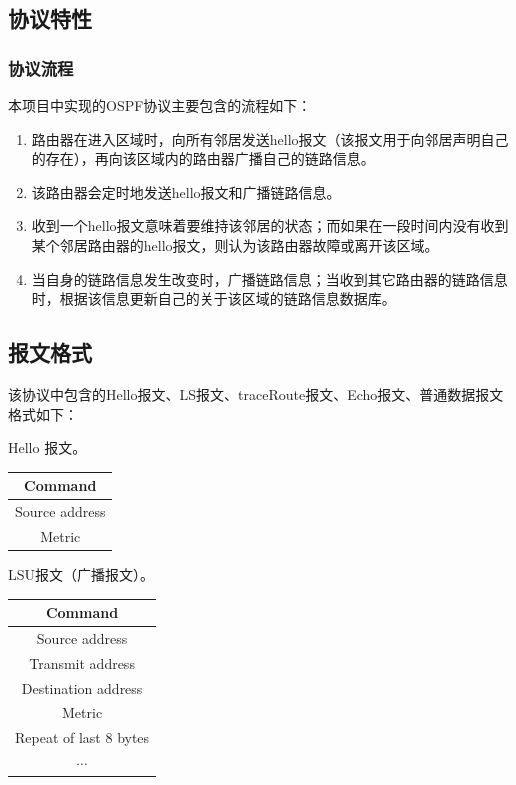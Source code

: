 	\subsection{协议特性} %
	\label{sub:协议特性}
		\subsubsection{协议流程} %
		\label{ssub:协议流程}
		本项目中实现的OSPF协议主要包含的流程如下：
		\begin{enumerate}
			\item 路由器在进入区域时，向所有邻居发送hello报文（该报文用于向邻居声明自己的存在），再向该区域内的路由器广播自己的链路信息。
			\item 该路由器会定时地发送hello报文和广播链路信息。
			\item 收到一个hello报文意味着要维持该邻居的状态；而如果在一段时间内没有收到某个邻居路由器的hello报文，则认为该路由器故障或离开该区域。
			\item 当自身的链路信息发生改变时，广播链路信息；当收到其它路由器的链路信息时，根据该信息更新自己的关于该区域的链路信息数据库。
		\end{enumerate}		
	\subsection{报文格式} %
	\label{sub:报文格式}
		该协议中包含的Hello报文、LS报文、traceRoute报文、Echo报文、普通数据报文格式如下：
		\par Hello 报文。
	\begin{table}[H]
	\centering
		\begin{tabular}{|c|}
			\hline
			Command \\
			\hline
			Source address \\
			\hline
			Metric \\
			\hline
		\end{tabular}		
	\end{table}

	LSU报文（广播报文）。
	\begin{table}[H]
	\centering
	\begin{tabular}{|c|}
		\hline                 
		Command                \\
		\hline                 
		Source address         \\
		\hline                 
		Transmit address       \\
		\hline                 
		Destination address    \\
		\hline                 
		Metric                 \\
		\hline                 
		Repeat of last 8 bytes \\
		\hline                 
		$\cdots$               \\
		\hline                 
	\end{tabular}		
\end{table}

